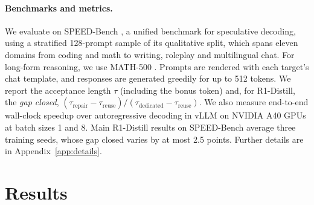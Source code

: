 \documentclass[11pt]{article}
\newcommand{\tauacc}{\tau}
\begin{document}
\paragraph{Benchmarks and metrics.}
We evaluate on SPEED-Bench \citep{abramovich2026speedbench}, a unified benchmark for speculative decoding, using a stratified 128-prompt sample of its qualitative split, which spans eleven domains from coding and math to writing, roleplay and multilingual chat.
For long-form reasoning, we use MATH-500 \citep{hendrycks2021math,lightman2024verify}.
Prompts are rendered with each target's chat template, and responses are generated greedily for up to 512 tokens.
We report the acceptance length $\tauacc$ (including the bonus token) and, for R1-Distill, the \emph{gap closed}, $(\tauacc_{\text{repair}} - \tauacc_{\text{reuse}}) / (\tauacc_{\text{dedicated}} - \tauacc_{\text{reuse}})$.
We also measure end-to-end wall-clock speedup over autoregressive decoding in vLLM on NVIDIA A40 GPUs at batch sizes 1 and 8.
Main R1-Distill results on SPEED-Bench average three training seeds, whose gap closed varies by at most 2.5 points.
Further details are in Appendix~\ref{app:details}.

\section{Results}
\label{sec:results}
\end{document}
